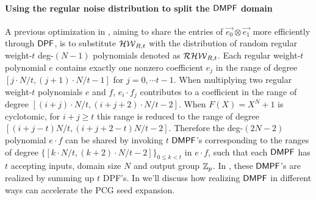  \paragraph{Using the regular noise distribution to split the ${\sf DMPF}$ domain}
A previous optimization in \cite{cryptoeprint:2022/1035}, aiming to share the entries of $\vec{e_0}\otimes \vec{e_1}$ more efficiently through ${\sf DPF}$, is to substitute $\mathcal{HW}_{R,t}$ with the distribution of random regular weight-$t$ deg-$(N-1)$ polynomials denoted as $\mathcal{RHW}_{R,t}$. Each regular weight-$t$ polynomial $e$ contains exactly one nonzero coefficient $e_j$ in the range of degree $[j\cdot N/t, (j+1)\cdot N/t-1]$ for $j=0,\cdots t-1$. When multiplying two regular weight-$t$ polynomials $e$ and $f$, $e_i\cdot f_j$ contributes to a coefficient in the range of degree $[(i+j)\cdot N/t, (i+j+2)\cdot N/t-2]$. When $F(X) = X^N+1$ is cyclotomic, for $i+j\ge t$ this range is reduced to the range of degree $[(i+j-t)N/t, (i+j+2-t)N/t-2]$. Therefore the deg-$(2N-2)$ polynomial $e\cdot f$ can be shared by invoking $t$ ${\sf DMPF}$'s corresponding to the ranges of degree $\{[k\cdot N/t, (k+2)\cdot N/t-2]\}_{0\le k<t}$ in $e\cdot f$, such that each ${\sf DMPF}$ has $t$ accepting inputs, domain size $N$ and output group $\mathbb{Z}_p$. In \cite{cryptoeprint:2022/1035}, these ${\sf DMPF}$'s are realized by summing up $t$ DPF's. In  we'll discuss how realizing ${\sf DMPF}$ in different ways can accelerate the PCG seed expansion. 



